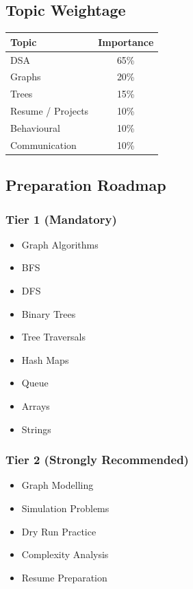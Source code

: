 \documentclass[11pt,a4paper]{article}
\begin{document}

\subsection{Topic Weightage}

\begin{center}
	\begin{tabular}{|l|c|}
		\hline
		Topic & Importance \\
		\hline
		DSA & 65\% \\
		Graphs & 20\% \\
		Trees & 15\% \\
		Resume / Projects & 10\% \\
		Behavioural & 10\% \\
		Communication & 10\% \\
		\hline
	\end{tabular}
\end{center}


\subsection{Preparation Roadmap}

\subsubsection{Tier 1 (Mandatory)}

\begin{itemize}
	\item Graph Algorithms
	\item BFS
	\item DFS
	\item Binary Trees
	\item Tree Traversals
	\item Hash Maps
	\item Queue
	\item Arrays
	\item Strings
\end{itemize}

\subsubsection{Tier 2 (Strongly Recommended)}

\begin{itemize}
	\item Graph Modelling
	\item Simulation Problems
	\item Dry Run Practice
	\item Complexity Analysis
	\item Resume Preparation
\end{itemize}
\end{document}
